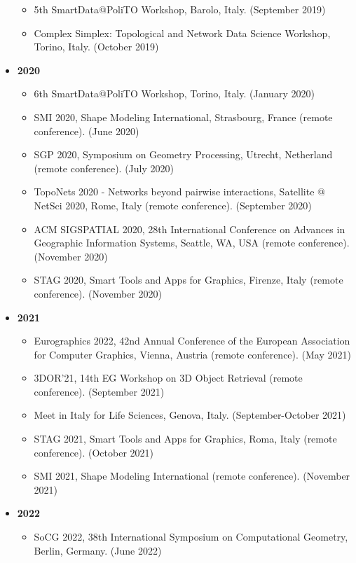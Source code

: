\documentclass[11pt]{article}
\begin{document}
\begin{itemize}
\begin{itemize}
\item{5th SmartData@PoliTO Workshop, Barolo, Italy. (September 2019)}
\item{Complex Simplex: Topological and Network Data Science Workshop, Torino, Italy. (October 2019)}
\end{itemize}
\vspace*{0.2ex}
\item[ ]{\bf 2020}
\begin{itemize}
\item{6th SmartData@PoliTO Workshop, Torino, Italy. (January 2020)}
\item{SMI 2020, Shape Modeling International, Strasbourg, France (remote conference). (June 2020)}
\item{SGP 2020, Symposium on Geometry Processing, Utrecht, Netherland (remote conference). (July 2020)}
\item{TopoNets 2020 - Networks beyond pairwise interactions, Satellite @ NetSci 2020, Rome, Italy (remote conference). (September 2020)}
\item{ACM SIGSPATIAL 2020, 28th International Conference on Advances in Geographic Information Systems, Seattle, WA, USA (remote conference). (November 2020)}
\item{STAG 2020, Smart Tools and Apps for Graphics, Firenze, Italy (remote conference). (November 2020)}
\end{itemize}
\vspace*{0.2ex}
\item[ ]{\bf 2021}
\begin{itemize}
\item{Eurographics 2022, 42nd Annual Conference of the European Association for Computer Graphics, Vienna, Austria (remote conference). (May 2021)}
\item{3DOR'21, 14th EG Workshop on 3D Object Retrieval (remote conference). (September 2021)}
\item{Meet in Italy for Life Sciences, Genova, Italy. (September-October 2021)}
\item{STAG 2021, Smart Tools and Apps for Graphics, Roma, Italy (remote conference). (October 2021)}
\item{SMI 2021, Shape Modeling International (remote conference). (November 2021)}
\end{itemize}
\item[ ]{\bf 2022}
\begin{itemize}
\item{SoCG 2022, 38th International Symposium on Computational Geometry, Berlin, Germany. (June 2022)}
\end{itemize}
\end{itemize}
\end{document}

